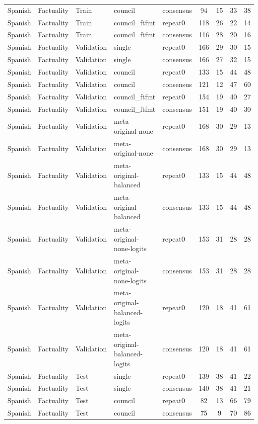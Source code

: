 \begin{tabular}{lllllcccc}
Spanish & Factuality & Train & council & consensus & 94 & 15 & 33 & 38 \\
Spanish & Factuality & Train & council\_ftfmt & repeat0 & 118 & 26 & 22 & 14 \\
Spanish & Factuality & Train & council\_ftfmt & consensus & 116 & 28 & 20 & 16 \\
Spanish & Factuality & Validation & single & repeat0 & 166 & 29 & 30 & 15 \\
Spanish & Factuality & Validation & single & consensus & 166 & 27 & 32 & 15 \\
Spanish & Factuality & Validation & council & repeat0 & 133 & 15 & 44 & 48 \\
Spanish & Factuality & Validation & council & consensus & 121 & 12 & 47 & 60 \\
Spanish & Factuality & Validation & council\_ftfmt & repeat0 & 154 & 19 & 40 & 27 \\
Spanish & Factuality & Validation & council\_ftfmt & consensus & 151 & 19 & 40 & 30 \\
Spanish & Factuality & Validation & meta-original-none & repeat0 & 168 & 30 & 29 & 13 \\
Spanish & Factuality & Validation & meta-original-none & consensus & 168 & 30 & 29 & 13 \\
Spanish & Factuality & Validation & meta-original-balanced & repeat0 & 133 & 15 & 44 & 48 \\
Spanish & Factuality & Validation & meta-original-balanced & consensus & 133 & 15 & 44 & 48 \\
Spanish & Factuality & Validation & meta-original-none-logits & repeat0 & 153 & 31 & 28 & 28 \\
Spanish & Factuality & Validation & meta-original-none-logits & consensus & 153 & 31 & 28 & 28 \\
Spanish & Factuality & Validation & meta-original-balanced-logits & repeat0 & 120 & 18 & 41 & 61 \\
Spanish & Factuality & Validation & meta-original-balanced-logits & consensus & 120 & 18 & 41 & 61 \\
Spanish & Factuality & Test & single & repeat0 & 139 & 38 & 41 & 22 \\
Spanish & Factuality & Test & single & consensus & 140 & 38 & 41 & 21 \\
Spanish & Factuality & Test & council & repeat0 & 82 & 13 & 66 & 79 \\
Spanish & Factuality & Test & council & consensus & 75 & 9 & 70 & 86 \\

\end{tabular}
